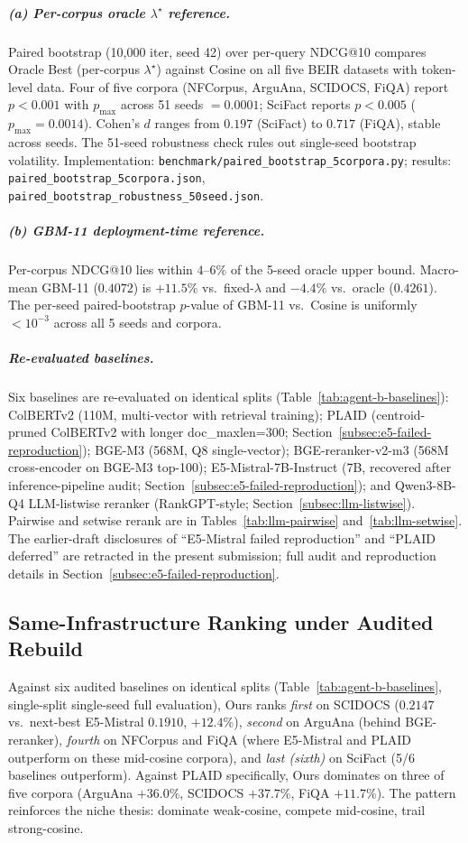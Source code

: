 \documentclass[review,1p]{elsarticle}
\begin{document}
\subparagraph{(a) Per-corpus oracle $\lambda^\star$ reference.} Paired bootstrap (10{,}000 iter, seed 42) over per-query NDCG@10 compares Oracle Best (per-corpus $\lambda^\star$) against Cosine on all five BEIR datasets with token-level data. Four of five corpora (NFCorpus, ArguAna, SCIDOCS, FiQA) report $p<0.001$ with $p_{\max}$ across 51 seeds $=0.0001$; SciFact reports $p<0.005$ ($p_{\max}=0.0014$). Cohen's $d$ ranges from $0.197$ (SciFact) to $0.717$ (FiQA), stable across seeds. The 51-seed robustness check rules out single-seed bootstrap volatility. Implementation: \texttt{benchmark/paired\_bootstrap\_5corpora.py}; results: \texttt{paired\_bootstrap\_5corpora.json}, \texttt{paired\_bootstrap\_robustness\_50seed.json}.

\subparagraph{(b) GBM-11 deployment-time reference.} Per-corpus NDCG@10 lies within $4$--$6\%$ of the 5-seed oracle upper bound. Macro-mean GBM-11 ($0.4072$) is $+11.5\%$ vs.\ fixed-$\lambda$ and $-4.4\%$ vs.\ oracle ($0.4261$). The per-seed paired-bootstrap $p$-value of GBM-11 vs.\ Cosine is uniformly $<10^{-3}$ across all 5 seeds and corpora.

\subparagraph{Re-evaluated baselines.} Six baselines are re-evaluated on identical splits (Table~\ref{tab:agent-b-baselines}): ColBERTv2 (110M, multi-vector with retrieval training); PLAID (centroid-pruned ColBERTv2 with longer doc\_maxlen=300; Section~\ref{subsec:e5-failed-reproduction}); BGE-M3 (568M, Q8 single-vector); BGE-reranker-v2-m3 (568M cross-encoder on BGE-M3 top-100); E5-Mistral-7B-Instruct (7B, recovered after inference-pipeline audit; Section~\ref{subsec:e5-failed-reproduction}); and Qwen3-8B-Q4 LLM-listwise reranker (RankGPT-style; Section~\ref{subsec:llm-listwise}). Pairwise and setwise rerank are in Tables~\ref{tab:llm-pairwise} and~\ref{tab:llm-setwise}. The earlier-draft disclosures of ``E5-Mistral failed reproduction'' and ``PLAID deferred'' are retracted in the present submission; full audit and reproduction details in Section~\ref{subsec:e5-failed-reproduction}.

\subsection{Same-Infrastructure Ranking under Audited Rebuild}\label{subsec:same-infra-ranking}

Against six audited baselines on identical splits (Table~\ref{tab:agent-b-baselines}, single-split single-seed full evaluation), Ours ranks \emph{first} on SCIDOCS ($0.2147$ vs.\ next-best E5-Mistral $0.1910$, $+12.4\%$), \emph{second} on ArguAna (behind BGE-reranker), \emph{fourth} on NFCorpus and FiQA (where E5-Mistral and PLAID outperform on these mid-cosine corpora), and \emph{last (sixth)} on SciFact (5/6 baselines outperform). Against PLAID specifically, Ours dominates on three of five corpora (ArguAna $+36.0\%$, SCIDOCS $+37.7\%$, FiQA $+11.7\%$). The pattern reinforces the niche thesis: dominate weak-cosine, compete mid-cosine, trail strong-cosine.
\end{document}
